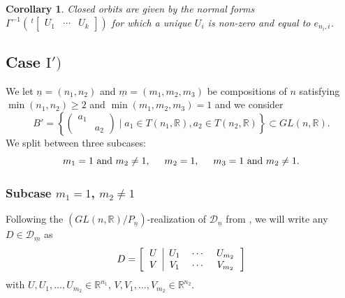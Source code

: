 \documentclass[pdftex]{sigma}
\numberwithin{equation}{section}
\newtheorem{Corollary}[Theorem]{Corollary}
\theoremstyle{definition}
\newcommand{\R}{\mathbb{R}}
\newcommand{\D}{\mathcal{D}}
\newcommand{\T}{T}
\theoremstyle{plain}
\theoremstyle{plain}
\theoremstyle{plain}
\theoremstyle{plain}
\begin{document}
\begin{Corollary}
	Closed orbits are given by the normal forms $\Gamma^{-1}\left(\,^t\begin{bmatrix}
		U_1 & \cdots & U_k
	\end{bmatrix}\right)$
	for which a unique $U_i$ is non-zero and equal to $e_{n_i,i}$.
\end{Corollary}












\subsection[Case I')]{Case $\mathrm{I}')$} \label{cas 1'}

We let $\underline n = (n_1,n_2)$ and $\underline m = (m_1,m_2,m_3)$ be compositions of $n$ satisfying $\min(n_1,n_2) \geqslant 2$ and $\min(m_1,m_2,m_3) = 1$ and we consider
\begin{equation*}
	B' = \left\{\begin{pmatrix}
	a_1 & \\
	& a_2
\end{pmatrix} \mid a_1 \in \T(n_1,\R), a_2 \in \T(n_2,\R)\right\} \subset GL(n,\R).
\end{equation*}
We split between three subcases:
\begin{equation*}
	m_1 = 1 \text{ and } m_2 \neq 1, \hspace{5mm} m_2 = 1, \hspace{5mm} m_3 = 1 \text{ and } m_2 \neq 1.
\end{equation*}

\subsubsection*{Subcase $m_1 = 1$, $m_2 \neq 1$}

Following the $(GL(n,\R)/P_{\underline n})$-realization of $\D_{\underline n}$ from , we will write any $D \in \D_{\underline m}$ as
\begin{equation*}
	D = \left[\begin{tabular}{c|ccc}
	$U$ & $U_1$ & $\cdots$ & $U_{m_2}$  \\
	$V$ & $V_1$ & $\cdots$ & $V_{m_2}$ 
\end{tabular}\right]
\end{equation*}
with $U,U_1,\dots, U_{m_2} \in \R^{n_1}$, $V,V_1,\dots,V_{m_2} \in \R^{n_2}$.
\end{document}
